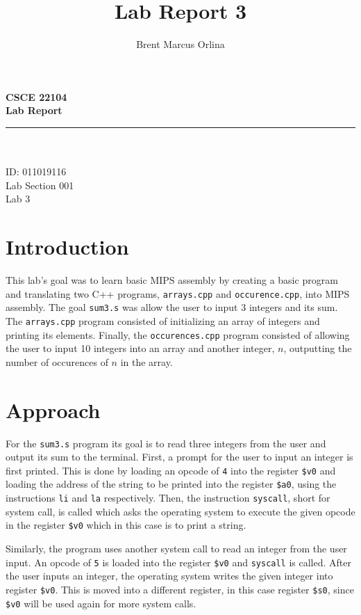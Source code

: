 \documentclass[11pt]{report}
\makeatletter
\newcommand{\@labsection}{000}
\newcommand{\labsection}[1]{
    \renewcommand{\@labsection}{#1}
}
\newcommand{\@labnumber}{0}
\newcommand{\labnumber}[1]{
    \renewcommand{\@labnumber}{#1}
}
\newcommand{\@shortsubmitted}{1/1/70}
\newcommand{\shortsubmitted}[1]{
    \renewcommand{\@shortsubmitted}{#1}
}
\renewcommand{\maketitle}{
    \newgeometry{left=1in, right=1in, top=1.75in, textheight=8.25in}
    \singlespacing
    \begin{center}
        {\huge \bf CSCE 22104} \\
        \vspace{2.5em}
        {\Large \bf Lab Report} \\
        \vspace{2em}
        \noindent\rule{20em}{0.4pt} \\
        \vspace{1em}
        {\Large \@author} \\
        \vspace{.75em}
        {\normalsize ID: 011019116} \\
        \vspace{.75em}
        {\normalsize Lab Section \@labsection} \\
        \vspace{.75em}
        {\normalsize Lab \@labnumber} \\
    \end{center}
    \newpage
    \restoregeometry
}
\makeatother
\begin{document}
\title{Lab Report 3}
\author{Brent Marcus Orlina}

\labsection{001}
\labnumber{3}

\shortsubmitted{3/7/25}

\maketitle

\section*{Introduction}
This lab's goal was to learn basic MIPS assembly by creating a basic program and translating two C++
programs, \verb|arrays.cpp| and \verb|occurence.cpp|, into MIPS assembly. The goal \verb|sum3.s| was
allow the user to input 3 integers and its sum. The \verb|arrays.cpp| program consisted of
initializing an array of integers and printing its elements. Finally, the \verb|occurences.cpp|
program consisted of allowing the user to input 10 integers into an array and another integer, $n$,
outputting the number of occurences of $n$ in the array.

\newpage

\section*{Approach}

For the \verb|sum3.s| program its goal is to read three integers from the user and output its sum to
the terminal. First, a prompt for the user to input an integer is first printed. This is done by
loading an opcode of \verb|4| into the register \verb|$v0| and loading the address of the string to
be printed into the register \verb|$a0|, using the instructions \verb|li| and \verb|la|
respectively. Then, the instruction \verb|syscall|, short for system call, is called which asks the
operating system to execute the given opcode in the register \verb|$v0| which in this case is to
print a string.

Similarly, the program uses another system call to read an integer from the user input. An opcode of
\verb|5| is loaded into the register \verb|$v0| and \verb|syscall| is called. After the user inputs
an integer, the operating system writes the given integer into register \verb|$v0|. This is moved
into a different register, in this case register \verb|$s0|, since \verb|$v0| will be used again for
more system calls.
\end{document}
